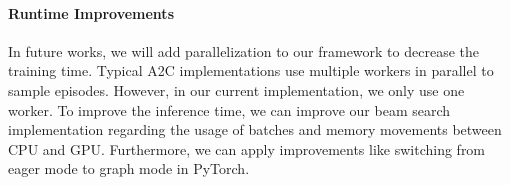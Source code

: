 \paragraph{Runtime Improvements}
In future works, we will add parallelization to our framework to decrease the training time.
Typical A2C implementations use multiple workers in parallel to sample episodes. However, in our current 
implementation, we only use one worker. To improve the inference time, we can improve our beam 
search implementation regarding the usage of batches and memory movements between CPU and GPU.
Furthermore, we can apply improvements like switching from eager mode to graph mode in PyTorch.